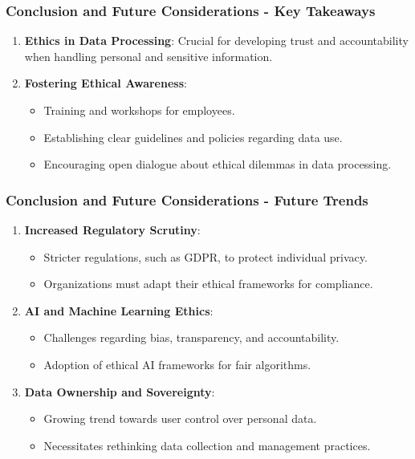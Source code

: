 \documentclass{beamer}
\begin{document}
\begin{frame}[fragile]
    \frametitle{Conclusion and Future Considerations - Key Takeaways}
    \begin{enumerate}
        \item \textbf{Ethics in Data Processing}: Crucial for developing trust and accountability when handling personal and sensitive information.
        \item \textbf{Fostering Ethical Awareness}: 
        \begin{itemize}
            \item Training and workshops for employees.
            \item Establishing clear guidelines and policies regarding data use.
            \item Encouraging open dialogue about ethical dilemmas in data processing.
        \end{itemize}
    \end{enumerate}
\end{frame}

\begin{frame}[fragile]
    \frametitle{Conclusion and Future Considerations - Future Trends}
    \begin{enumerate}
        \item \textbf{Increased Regulatory Scrutiny}:
        \begin{itemize}
            \item Stricter regulations, such as GDPR, to protect individual privacy.
            \item Organizations must adapt their ethical frameworks for compliance.
        \end{itemize}
        
        \item \textbf{AI and Machine Learning Ethics}:
        \begin{itemize}
            \item Challenges regarding bias, transparency, and accountability.
            \item Adoption of ethical AI frameworks for fair algorithms.
        \end{itemize}
        
        \item \textbf{Data Ownership and Sovereignty}:
        \begin{itemize}
            \item Growing trend towards user control over personal data.
            \item Necessitates rethinking data collection and management practices.
        \end{itemize}
    \end{enumerate}
\end{frame}
\end{document}
